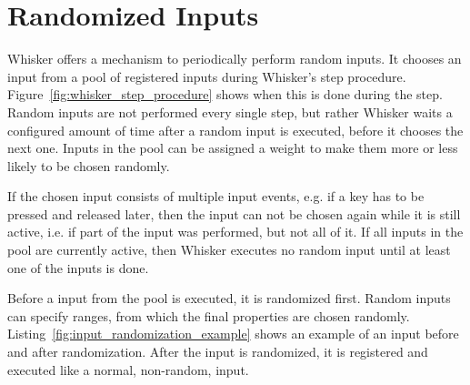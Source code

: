 \section{Randomized Inputs}
\label{sec:randomized_inputs}

Whisker offers a mechanism to periodically perform random inputs.
It chooses an input from a pool of registered inputs during Whisker's step procedure.
Figure~\ref{fig:whisker_step_procedure} shows when this is done during the step.
Random inputs are not performed every single step,
but rather Whisker waits a configured amount of time after a random input is executed,
before it chooses the next one.
Inputs in the pool can be assigned a weight to make them more or less likely to be chosen randomly.
\parspace

If the chosen input consists of multiple input events,
e.g. if a key has to be pressed and released later,
then the input can not be chosen again while it is still active,
i.e. if part of the input was performed, but not all of it.
If all inputs in the pool are currently active,
then Whisker executes no random input until at least one of the inputs is done.
\parspace

Before a input from the pool is executed, it is randomized first.
Random inputs can specify ranges, from which the final properties are chosen randomly.
Listing~\ref{fig:input_randomization_example} shows an example of an input before and after randomization.
After the input is randomized, it is registered and executed like a normal, non-random, input.
\parspace

